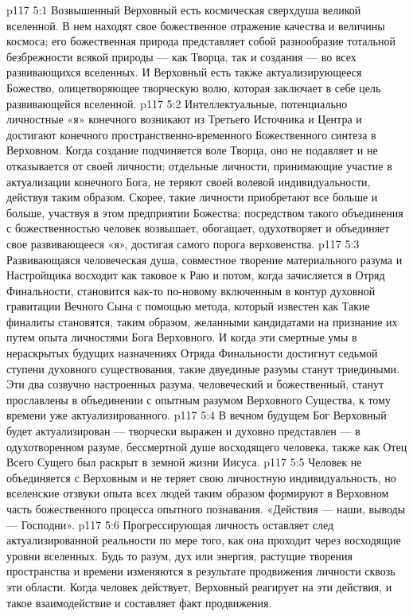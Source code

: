 \vs p117 5:1 Возвышенный Верховный есть космическая сверхдуша великой вселенной. В нем находят свое божественное отражение качества и величины космоса; его божественная природа представляет собой разнообразие тотальной безбрежности всякой природы --- как Творца, так и создания --- во всех развивающихся вселенных. И Верховный есть также актуализирующееся Божество, олицетворяющее творческую волю, которая заключает в себе цель развивающейся вселенной.
\vs p117 5:2 Интеллектуальные, потенциально личностные «я» конечного возникают из Третьего Источника и Центра и достигают конечного пространственно\hyp{}временного Божественного синтеза в Верховном. Когда создание подчиняется воле Творца, оно не подавляет и не отказывается от своей личности; отдельные личности, принимающие участие в актуализации конечного Бога, не теряют своей волевой индивидуальности, действуя таким образом. Скорее, такие личности приобретают все больше и больше, участвуя в этом предприятии Божества; посредством такого объединения с божественностью человек возвышает, обогащает, одухотворяет и объединяет свое развивающееся «я», достигая самого порога верховенства.
\vs p117 5:3 \pc Развивающаяся человеческая душа, совместное творение материального разума и Настройщика восходит как таковое к Раю и потом, когда зачисляется в Отряд Финальности, становится как\hyp{}то по\hyp{}новому включенным в контур духовной гравитации Вечного Сына с помощью метода, который известен как  Такие финалиты становятся, таким образом, желанными кандидатами на признание их путем опыта личностями Бога Верховного. И когда эти смертные умы в нераскрытых будущих назначениях Отряда Финальности достигнут седьмой ступени духовного существования, такие двуединые разумы станут триедиными. Эти два созвучно настроенных разума, человеческий и божественный, станут прославлены в объединении с опытным разумом Верховного Существа, к тому времени уже актуализированного.
\vs p117 5:4 В вечном будущем Бог Верховный будет актуализирован --- творчески выражен и духовно представлен --- в одухотворенном разуме, бессмертной душе восходящего человека, также как Отец Всего Сущего был раскрыт в земной жизни Иисуса.
\vs p117 5:5 \pc Человек не объединяется с Верховным и не теряет свою личностную индивидуальность, но вселенские отзвуки опыта всех людей таким образом формируют в Верховном часть божественного процесса опытного познавания. «Действия --- наши, выводы --- Господни».
\vs p117 5:6 Прогрессирующая личность оставляет след актуализированной реальности по мере того, как она проходит через восходящие уровни вселенных. Будь то разум, дух или энергия, растущие творения пространства и времени изменяются в результате продвижения личности сквозь эти области. Когда человек действует, Верховный реагирует на эти действия, и такое взаимодействие и составляет факт продвижения.
